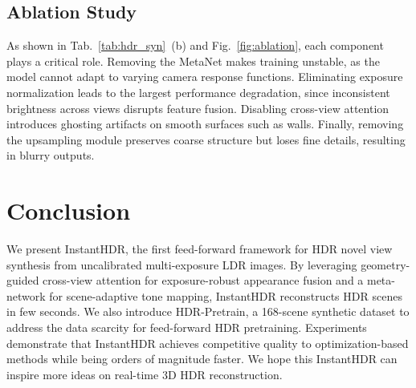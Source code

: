 \documentclass[runningheads]{llncs}
\begin{document}
\subsection{Ablation Study}
As shown in Tab.~\ref{tab:hdr_syn}~(b) and Fig.~\ref{fig:ablation}, each component plays a critical role. 
Removing the MetaNet makes training unstable, as the model cannot adapt to varying camera response functions. 
Eliminating exposure normalization leads to the largest performance degradation, since inconsistent brightness across views disrupts feature fusion. 
Disabling cross-view attention introduces ghosting artifacts on smooth surfaces such as walls. 
Finally, removing the upsampling module preserves coarse structure but loses fine details, resulting in blurry outputs.


\vspace{-1em}
\section{Conclusion}
\label{sec:conclusion}
We present InstantHDR, the first feed-forward framework for HDR novel view synthesis from uncalibrated multi-exposure LDR images.
By leveraging geometry-guided cross-view attention for exposure-robust appearance fusion and a meta-network for scene-adaptive tone mapping, InstantHDR reconstructs HDR scenes in few seconds.
We also introduce HDR-Pretrain, a 168-scene synthetic dataset to address the data scarcity for feed-forward HDR pretraining.
Experiments demonstrate that InstantHDR achieves competitive quality to optimization-based methods while being orders of magnitude faster.
We hope this InstantHDR can inspire more ideas on real-time 3D HDR reconstruction.


\end{document}
